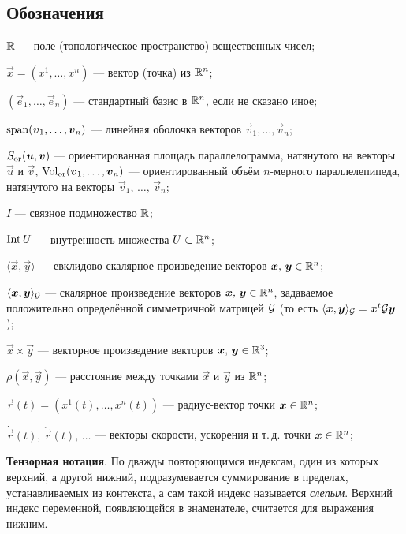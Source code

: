 \subsection*{Обозначения}

\begin{center}
	\begin{minipage}{.9\textwidth}
		$\mathbb{R}$ --- поле (топологическое пространство) вещественных чисел;

		$\vec{x} = (x^1, \ldots, x^n)$ --- вектор (точка) из $\mathbb{R}^n$;
		
		$(\vec{e}_1, \ldots, \vec{e}_n)$ --- стандартный базис в $\mathbb{R}^n$, если не сказано иное;

		$\operatorname{span}(\boldsymbol{v}_1, \ldots, \boldsymbol{v}_n)$ --- линейная оболочка векторов $\vec{v}_1, \ldots, \vec{v}_n$;

		$S_{\mathrm{or}}(\boldsymbol{u}, \boldsymbol{v})$ --- ориентированная площадь параллелограмма, натянутого на векторы $\vec{u}$ и $\vec{v}$, $\operatorname{Vol}_{\mathrm{or}}(\boldsymbol{v}_1, \ldots, \boldsymbol{v}_n)$ --- ориентированный объём $n$-мерного параллелепипеда, натянутого на векторы $\vec{v}_1,\,\ldots,\,\vec{v}_n$;

		$I$ --- связное подмножество $\mathbb{R}$;

		$\operatorname{Int} U$ --- внутренность множества $U \subset \mathbb{R}^n$;

		$\langle\vec{x}, \vec{y}\rangle$ --- евклидово скалярное произведение векторов $\boldsymbol{x},\,\boldsymbol{y} \in \mathbb{R}^n$;

		$\langle\boldsymbol{x}, \boldsymbol{y}\rangle_{\mathcal{G}}$ --- скалярное произведение векторов $\boldsymbol{x},\,\boldsymbol{y} \in \mathbb{R}^n$, задаваемое положительно определённой симметричной матрицей $\mathcal{G}$ (то есть $\langle\boldsymbol{x}, \boldsymbol{y}\rangle_{\mathcal{G}} = \boldsymbol{x}^t\mathcal{G}\boldsymbol{y}$);

		$\vec{x} \times \vec{y}$ --- векторное произведение векторов $\boldsymbol{x},\,\boldsymbol{y} \in \mathbb{R}^3$;

		$\rho(\vec{x}, \vec{y})$ --- расстояние между точками $\vec{x}$ и $\vec{y}$ из $\mathbb{R}^n$;

		$\vec{r}(t) = (x^1(t), \ldots, x^n(t))$ --- радиус-вектор точки $\boldsymbol{x} \in \mathbb{R}^n$;

		$\dot{\vec{r}}(t),\,\ddot{\vec{r}}(t),\,\ldots$ --- векторы скорости, ускорения и т.\,д. точки $\boldsymbol{x} \in \mathbb{R}^n$;

		\medskip
		\textbf{Тензорная нотация}. {\small По дважды повторяющимся индексам, один из которых верхний, а другой нижний, подразумевается суммирование в пределах, устанавливаемых из контекста, а сам такой индекс называется \textit{слепым}. Верхний индекс переменной, появляющейся в знаменателе, считается для выражения нижним.}
	\end{minipage}
\end{center}

